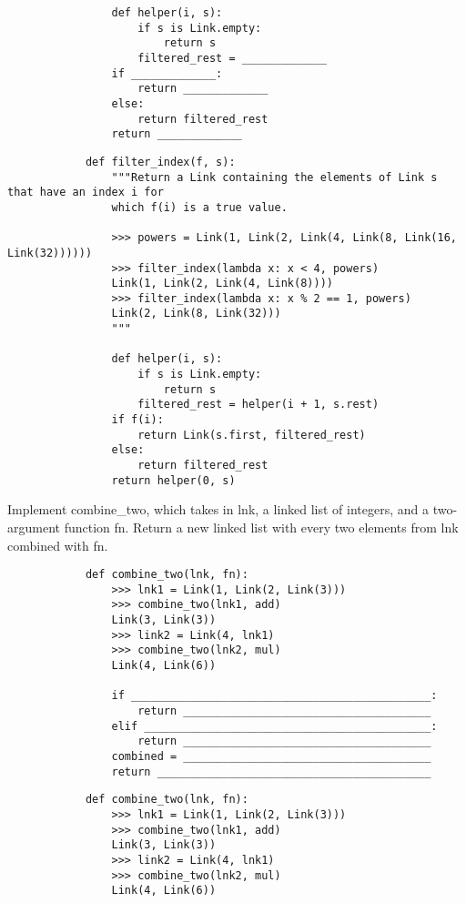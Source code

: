 \documentclass{exam}
\begin{document}
\begin{questions}
\begin{blocksection}
\begin{blocksection}
\begin{lstlisting}
				def helper(i, s):
					if s is Link.empty:
						return s
					filtered_rest = _____________
				if _____________:
					return _____________
				else:
					return filtered_rest
				return _____________
		\end{lstlisting}
	\end{blocksection}
	\begin{solution}
		\begin{lstlisting}
			def filter_index(f, s):
				"""Return a Link containing the elements of Link s that have an index i for
				which f(i) is a true value.
				
				>>> powers = Link(1, Link(2, Link(4, Link(8, Link(16, Link(32))))))
				>>> filter_index(lambda x: x < 4, powers)
				Link(1, Link(2, Link(4, Link(8))))
				>>> filter_index(lambda x: x % 2 == 1, powers)
				Link(2, Link(8, Link(32)))
				"""
				
				def helper(i, s):
					if s is Link.empty:
						return s
					filtered_rest = helper(i + 1, s.rest)
				if f(i):
					return Link(s.first, filtered_rest)
				else:
					return filtered_rest
				return helper(0, s)
		\end{lstlisting}
	\end{solution}
	\begin{blocksection}
		Implement combine_two, which takes in lnk, a linked list of integers, and a two-argument function fn. Return a new linked list with every two elements from lnk combined with fn.
		\begin{lstlisting}
			def combine_two(lnk, fn):
				>>> lnk1 = Link(1, Link(2, Link(3)))
				>>> combine_two(lnk1, add)
				Link(3, Link(3))
				>>> link2 = Link(4, lnk1)
				>>> combine_two(lnk2, mul)
				Link(4, Link(6))
			
				if ______________________________________________:
        			return ______________________________________
    			elif ____________________________________________:
        			return ______________________________________
    			combined = ______________________________________
    			return __________________________________________
		\end{lstlisting}
	\end{blocksection}
	\begin{solution}
		\begin{lstlisting}
			def combine_two(lnk, fn):
				>>> lnk1 = Link(1, Link(2, Link(3)))
				>>> combine_two(lnk1, add)
				Link(3, Link(3))
				>>> link2 = Link(4, lnk1)
				>>> combine_two(lnk2, mul)
				Link(4, Link(6))
			

\end{lstlisting}
\end{solution}
\end{blocksection}
\end{questions}
\end{document}
